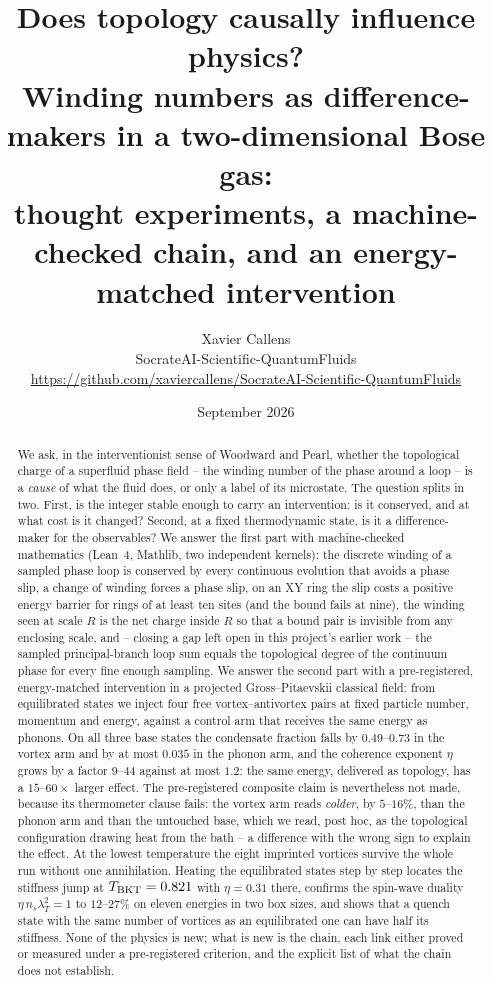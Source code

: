 \documentclass[11pt,a4paper]{article}
\title{\textbf{Does topology causally influence physics?}\\
\large Winding numbers as difference-makers in a two-dimensional Bose gas:\\
thought experiments, a machine-checked chain, and an energy-matched intervention}
\author{Xavier Callens\\
\small SocrateAI-Scientific-QuantumFluids\\
\small \url{https://github.com/xaviercallens/SocrateAI-Scientific-QuantumFluids}}
\date{September 2026}
\begin{document}
\maketitle

\begin{abstract}
\noindent
We ask, in the interventionist sense of Woodward and Pearl, whether the topological charge of a
superfluid phase field -- the winding number of the phase around a loop -- is a \emph{cause} of what
the fluid does, or only a label of its microstate. The question splits in two. First, is the integer
stable enough to carry an intervention: is it conserved, and at what cost is it changed? Second, at
a fixed thermodynamic state, is it a difference-maker for the observables? We answer the first part
with machine-checked mathematics (Lean~4, Mathlib, two independent kernels): the discrete winding of
a sampled phase loop is conserved by every continuous evolution that avoids a phase slip, a change of
winding forces a phase slip, on an XY ring the slip costs a positive energy barrier for rings of at
least ten sites (and the bound fails at nine), the winding seen at scale $R$ is the net charge inside
$R$ so that a bound pair is invisible from any enclosing scale, and -- closing a gap left open in this
project's earlier work -- the sampled principal-branch loop sum equals the topological degree of the
continuum phase for every fine enough sampling. We answer the second part with a pre-registered,
energy-matched intervention in a projected Gross--Pitaevskii classical field: from equilibrated
states we inject four free vortex--antivortex pairs at fixed particle number, momentum and energy,
against a control arm that receives the same energy as phonons. On all three base states the
condensate fraction falls by $0.49$--$0.73$ in the vortex arm and by at most $0.035$ in the phonon
arm, and the coherence exponent $\eta$ grows by a factor $9$--$44$ against at most $1.2$: the same
energy, delivered as topology, has a $15$--$60\times$ larger effect. The pre-registered composite
claim is nevertheless not made, because its thermometer clause fails: the vortex arm reads
\emph{colder}, by $5$--$16\%$, than the phonon arm and than the untouched base, which we read, post
hoc, as the topological configuration drawing heat from the bath -- a difference with the wrong sign
to explain the effect. At the lowest temperature the eight imprinted vortices survive the whole run
without one annihilation. Heating the equilibrated states step by step locates the stiffness jump at
$T_{\rm BKT}=0.821$ with $\eta=0.31$ there, confirms the spin-wave duality $\eta\,n_s\lambda_T^2=1$ to
$12$--$27\%$ on eleven energies in two box sizes, and shows that a quench state with the same number
of vortices as an equilibrated one can have half its stiffness. None of the physics is
new; what is new is the chain, each link either proved or measured under a pre-registered criterion,
and the explicit list of what the chain does not establish.
\end{abstract}
\end{document}
